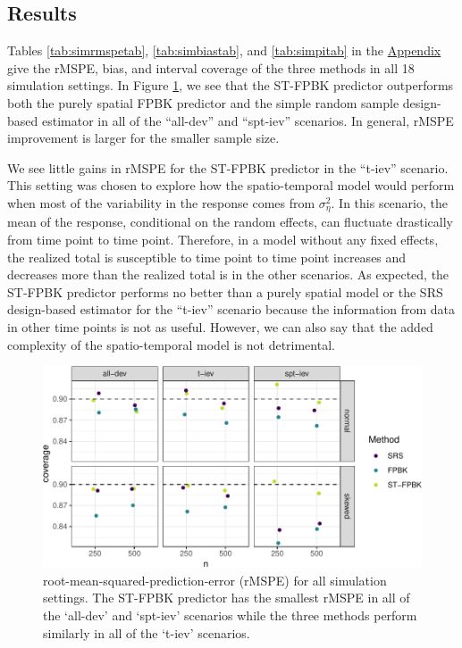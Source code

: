 \documentclass[smallextended]{svjour3}       %
\begin{document}
\hypertarget{results}{%
\subsection{Results}\label{results}}

Tables \ref{tab:simrmspetab}, \ref{tab:simbiastab}, and
\ref{tab:simpitab} in the \protect\hyperlink{appendix}{Appendix} give
the rMSPE, bias, and interval coverage of the three methods in all 18
simulation settings. In Figure \ref{fig:rmspe}, we see that the ST-FPBK
predictor outperforms both the purely spatial FPBK predictor and the
simple random sample design-based estimator in all of the ``all-dev''
and ``spt-iev'' scenarios. In general, rMSPE improvement is larger for
the smaller sample size.

We see little gains in rMSPE for the ST-FPBK predictor in the ``t-iev''
scenario. This setting was chosen to explore how the spatio-temporal
model would perform when most of the variability in the response comes
from \(\sigma^2_{\eta}\). In this scenario, the mean of the response,
conditional on the random effects, can fluctuate drastically from time
point to time point. Therefore, in a model without any fixed effects,
the realized total is susceptible to time point to time point increases
and decreases more than the realized total is in the other scenarios. As
expected, the ST-FPBK predictor performs no better than a purely spatial
model or the SRS design-based estimator for the ``t-iev'' scenario
because the information from data in other time points is not as useful.
However, we can also say that the added complexity of the
spatio-temporal model is not detrimental.

\begin{figure}
\centering
\includegraphics{preprint_springer_files/figure-latex/unnamed-chunk-19-1.pdf}
\caption{\label{fig:rmspe} root-mean-squared-prediction-error (rMSPE)
for all simulation settings. The ST-FPBK predictor has the smallest
rMSPE in all of the `all-dev' and `spt-iev' scenarios while the three
methods perform similarly in all of the `t-iev' scenarios.}
\end{figure}
\end{document}
